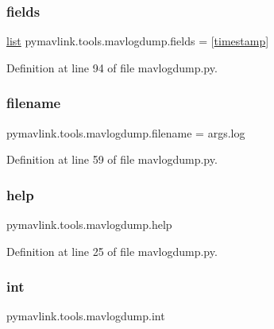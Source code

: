 \subsubsection{\texorpdfstring{fields}{fields}}
{\footnotesize\ttfamily \mbox{\hyperlink{structlist}{list}} pymavlink.\+tools.\+mavlogdump.\+fields = \mbox{[}\textquotesingle{}\mbox{\hyperlink{namespacepymavlink_1_1tools_1_1mavlogdump_a48f60cea754ecb290fd64f00e0ed6840}{timestamp}}\textquotesingle{}\mbox{]}}



Definition at line 94 of file mavlogdump.\+py.

\mbox{\label{namespacepymavlink_1_1tools_1_1mavlogdump_a1a3af4daa72962166a120b07458a1d2d}} 
\subsubsection{\texorpdfstring{filename}{filename}}
{\footnotesize\ttfamily pymavlink.\+tools.\+mavlogdump.\+filename = args.\+log}



Definition at line 59 of file mavlogdump.\+py.

\mbox{\label{namespacepymavlink_1_1tools_1_1mavlogdump_a4059ef7894b5364373bb603635bda68c}} 
\subsubsection{\texorpdfstring{help}{help}}
{\footnotesize\ttfamily pymavlink.\+tools.\+mavlogdump.\+help}



Definition at line 25 of file mavlogdump.\+py.

\mbox{\label{namespacepymavlink_1_1tools_1_1mavlogdump_a2fe404e5ba17834d53138cfe0a4fd638}} 
\subsubsection{\texorpdfstring{int}{int}}
{\footnotesize\ttfamily pymavlink.\+tools.\+mavlogdump.\+int}



